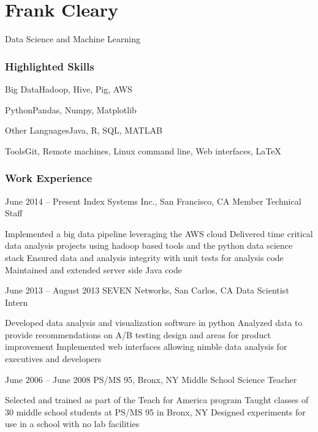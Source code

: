 \documentclass[11pt]{tccv}
\begin{document}
\part{Frank Cleary}{Data Science and Machine Learning}

\section{Highlighted Skills}

\begin{factlist}
\item{Big Data}{Hadoop, Hive, Pig, AWS}
\item{Python}{Pandas, Numpy, Matplotlib}
\item{Other Languages}{Java, R, SQL, MATLAB}
\item{Tools}{Git, Remote machines, Linux command line, Web interfaces, \LaTeX}
\end{factlist}

\section{Work Experience}

\begin{eventlist}

\item{June 2014 -- Present}
  {Index Systems Inc., San Francisco, CA}
  {Member Technical Staff}
  \begin{itemize}
    \olditem Implemented a big data pipeline leveraging the AWS cloud
    \olditem Delivered time critical data analysis projects using hadoop based tools and the python data science stack
    \olditem Ensured data and analysis integrity with unit tests for analysis code
    \olditem Maintained and extended server side Java code
  \end{itemize}
  
\item{June 2013 -- August 2013}
  {SEVEN Networks, San Carlos, CA}
  {Data Scientist Intern}
  \begin{itemize}
    \olditem Developed data analysis and visualization software in python
    \olditem Analyzed data to provide recommendations on A/B testing design and areas for product improvement
    \olditem Implemented web interfaces allowing nimble data analysis for executives and developers
  \end{itemize}

\item{June 2006 -- June 2008}
  {PS/MS 95, Bronx, NY}
  {Middle School Science Teacher}
  \begin{itemize}
    \olditem Selected and trained as part of the Teach for America program
    \olditem Taught classes of 30 middle school students at PS/MS 95 in Bronx, NY 
    \olditem Designed experiments for use in a school with no lab facilities 
  \end{itemize}  
\end{eventlist}
\end{document}
